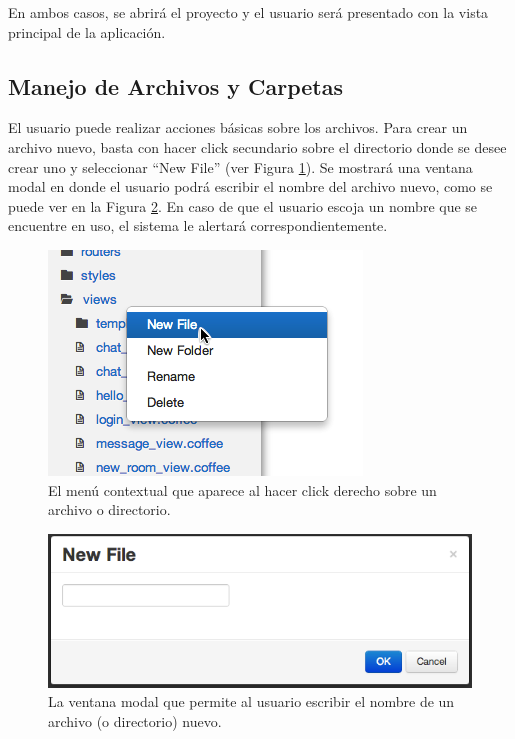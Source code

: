 \documentclass[12pt,spanish,letter]{report}
\makeatletter
\def\maxwidth{\ifdim\Gin@nat@width>\linewidth\linewidth
\else\Gin@nat@width\fi}
\let\Oldincludegraphics\includegraphics
\renewcommand{\includegraphics}[1]{\Oldincludegraphics[width=\maxwidth]{#1}}
\makeatother
\begin{document}
En ambos casos, se abrirá el proyecto y el usuario será presentado con
la vista principal de la aplicación.

\subsection{Manejo de Archivos y Carpetas}

El usuario puede realizar acciones básicas sobre los archivos. Para
crear un archivo nuevo, basta con hacer click secundario sobre el
directorio donde se desee crear uno y seleccionar ``New File'' (ver
Figura \ref{figures:tutorial-new-file}). Se mostrará una ventana modal
en donde el usuario podrá escribir el nombre del archivo nuevo, como se
puede ver en la Figura \ref{figures:tutorial-new-file-prompt}. En caso
de que el usuario escoja un nombre que se encuentre en uso, el sistema
le alertará correspondientemente.

\begin{figure}[htbp]
\centering
\includegraphics{figures/tutorial-new-file.png}
\caption{El menú contextual que aparece al hacer click derecho sobre un
archivo o directorio.\label{figures:tutorial-new-file}}
\end{figure}

\begin{figure}[htbp]
\centering
\includegraphics{figures/tutorial-new-file-prompt.png}
\caption{La ventana modal que permite al usuario escribir el nombre de
un archivo (o directorio)
nuevo.\label{figures:tutorial-new-file-prompt}}
\end{figure}
\end{document}
